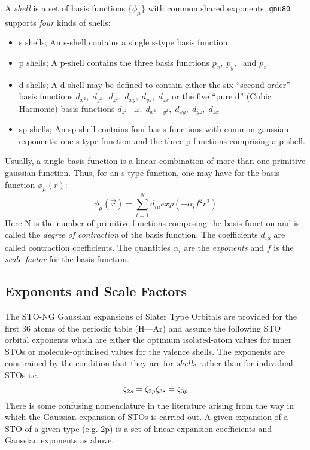 A {\em shell} is a set of basis functions 
$\{\phi_\mu\}$ with common shared exponents. {\tt gnu80}
supports {\em four} kinds of shells: 
\begin{itemize}
\item s shells; An s-shell contains a single s-type basis function. 
\item p shells; A p-shell contains
the three basis functions $p_x ,\; p_y , \;$ and $p_z$. 
\item d shells; A d-shell may be defined to
contain either the six ``second-order'' basis functions 
$d_{x^2}, \; d_{y^2}, \; d_{z^2}, \; d_{xy}, \; d_{yz}, \; d_{zx} $
or the five ``pure d'' (Cubic Harmonic) basis functions 
$d_{z^2-r^2}, \; d_{x^2-y^2}, \; d_{xy}, \; d_{yz}, \; d_{zx}$
\item sp shells; An sp-shell contains four basis functions with common
gaussian exponents: one s-type function and the three p-functions 
comprising a p-shell.
\end{itemize}
Usually, a single basis function is a linear combination of more than one
primitive gaussian function.  Thus, for an s-type function, one may
have for the basis function $\phi_\mu (r)$:
\[
\phi_\mu (\vec{r}) = \sum_{i=1}^{N} { d_{i\mu} exp(- \alpha_i
f^2 r^2 ) }
\]
Here N is the number of primitive functions composing the basis
function and is called the {\em degree of contraction} of the basis function.
The coefficients $d_{i\mu}$ are called contraction coefficients.  
The quantities
$\alpha_i$ are the {\em exponents} and $f$ is the {\em scale factor} 
for the basis function.
\subsection{\sf Exponents and Scale Factors}
The STO-NG Gaussian expansions of Slater Type Orbitals are provided
for the first 36 atoms of the periodic table (H---Ar) and 
assume the following STO orbital exponents which are either
the optimum isolated-atom values for inner STOs or
molecule-optimised values for the valence shells. The exponents
are constrained by the condition that they are for {\em shells}
rather than for individual STOs i.e. 
\[
\zeta_{2s} = \zeta_{2p} \\
\zeta_{3s} = \zeta_{3p}
\]
There is some confusing nomenclature in the literature arising from the
way in which the Gaussian expansion of STOs is carried out.
A given expansion of a STO of a given type (e.g. 2p) is a set of
linear expansion coefficients and Gaussian exponents as above.

